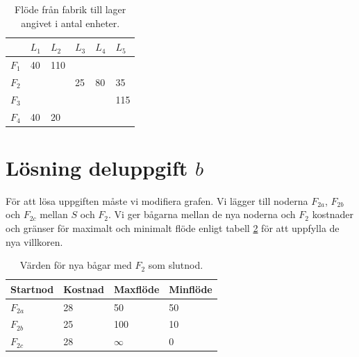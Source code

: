 \documentclass[titlepage, a4paper]{article}
\begin{document}
\begin{table}[h!]
    \centering
    \begin{tabular}{ | l | l | l | l | l | l | }
        \hline
        {} & {$L_{1}$} & {$L_{2}$} & {$L_{3}$} & {$L_{4}$} & {$L_{5}$} \\\hline
        {$F_{1}$} & {40} & {110} & {} & {} & {} \\\hline
        {$F_{2}$} & {} & {} & {25} & {80} & {35} \\\hline
        {$F_{3}$} & {} & {} & {} & {} & {115} \\\hline
        {$F_{4}$} & {40} & {20} & {} & {} & {} \\\hline
    \end{tabular}
    \caption{Flöde från fabrik till lager angivet i antal enheter.} \label{uppgifta-flode}
\end{table}

\newpage

\section{Lösning deluppgift $b$}

För att lösa uppgiften måste vi modifiera grafen. Vi lägger till noderna $F_{2a}$, $F_{2b}$ och $F_{2c}$ mellan $S$ och $F_{2}$. Vi ger bågarna mellan de nya noderna och $F_{2}$ kostnader och gränser för maximalt och minimalt flöde enligt tabell \ref{uppgiftb-bagar} för att uppfylla de nya villkoren.

\begin{table}[h!]
    \centering
    \begin{tabular}{ | l | l | l | l | }
        \hline
        {\textbf{Startnod}} & {\textbf{Kostnad}} & {\textbf{Maxflöde}} & {\textbf{Minflöde}} \\\hline
        {$F_{2a}$} & {28} & {50} & {50} \\\hline
        {$F_{2b}$} & {25} & {100} & {10} \\\hline
        {$F_{2c}$} & {28} & {$\infty$} & {0} \\\hline
    \end{tabular}
    \caption{Värden för nya bågar med $F_{2}$ som slutnod.} \label{uppgiftb-bagar}
\end{table}
\end{document}
